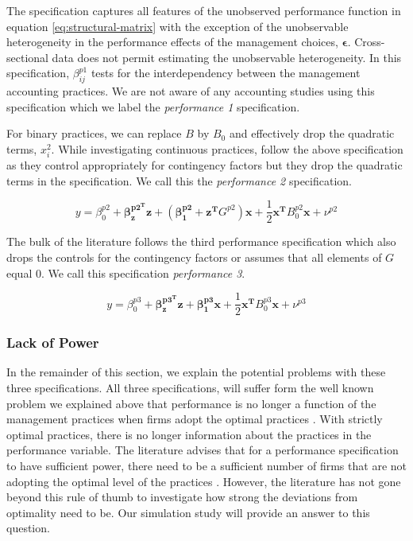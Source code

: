 \documentclass[12pt]{article}
\begin{document}
The specification captures all features of the unobserved performance function in equation \eqref{eq:structural-matrix} with the exception of the unobservable heterogeneity in the performance effects of the management choices, $\mathbf{\epsilon}$. Cross-sectional data does not permit estimating the unobservable heterogeneity. In this specification, \(\beta_{ij}^{p1}\) tests for the interdependency between the management accounting practices. We are not aware of any accounting studies using this specification which we label the \emph{performance 1} specification. 

For binary practices, we can replace $B$ by $B_0$ and effectively drop the quadratic terms, $x_i^2$.  While investigating continuous practices, \citet{Bedford2016} follow the above specification as they control appropriately for contingency factors but they drop the quadratic terms in the specification. We call this the \emph{performance 2} specification.

\begin{equation*}
    y = \beta_0^{p2} + \mathbf{\beta_z^{p2^T} z} + (\mathbf{\beta_1^{p2}} + \mathbf{z^T} G^{p2}) \mathbf{x} + 
    \frac{1}{2}\mathbf{x^T} B_0^{p2} \mathbf{x} + \nu^{p2}
\end{equation*}

The bulk of the literature follows the third performance specification which also drops the controls for the contingency factors or assumes that all elements of $G$ equal $0$. We call this specification \emph{performance 3}.

\begin{equation*}
    y = \beta_0^{p3} + \mathbf{\beta_z^{p3^T} z} + \mathbf{\beta_1^{p3}} \mathbf{x} + 
    \frac{1}{2}\mathbf{x^T} B_0^{p3} \mathbf{x} + \nu^{p3}
\end{equation*}

\subsubsection{Lack of Power}

In the remainder of this section, we explain the potential problems with these three specifications. All three specifications, will suffer form the well known problem we explained above that performance is no longer a function of the management practices when firms adopt the optimal practices \citep{Grabner2013}. With strictly optimal practices, there is no longer information about the practices in the performance variable. The literature advises that for a performance specification to have sufficient power, there need to be a sufficient number of firms that are not adopting the optimal level of the practices \citep{Bedford2016, Carree2011,  Hofmann2015OrganizationalChoices}. However, the literature has not gone beyond this rule of thumb to investigate how strong the deviations from optimality need to be. Our simulation study will provide an answer to this question.
\end{document}
